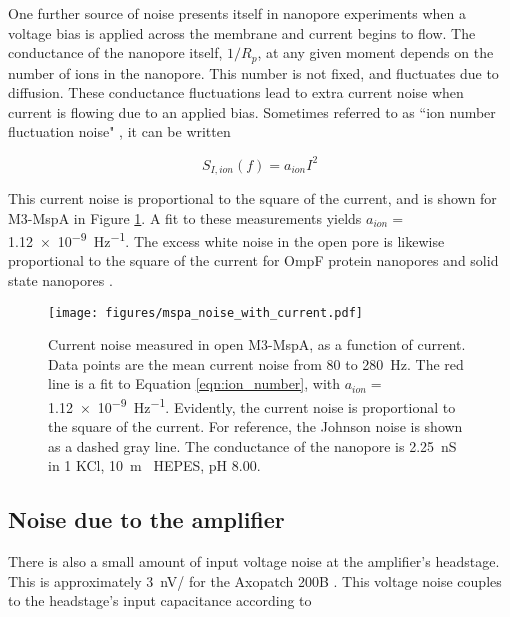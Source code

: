 One further source of noise presents itself in nanopore experiments when a voltage bias is applied across the membrane and current begins to flow.  The conductance of the nanopore itself, $1/R_p$, at any given moment depends on the number of ions in the nanopore.  This number is not fixed, and fluctuates due to diffusion.  These conductance fluctuations lead to extra current noise when current is flowing due to an applied bias.  Sometimes referred to as ``ion number fluctuation noise" \citep{Hoogerheide2010}, it can be written

\begin{equation}
S_{I,ion}(f) = a_{ion} I^2
\label{eqn:ion_number}
\end{equation}

This current noise is proportional to the square of the current, and is shown for M3-MspA in Figure \ref{fig:mspa_noise}.  A fit to these measurements yields $a_{ion} =$ \SI{1.12e-9}{\Hz^{-1}}.  The excess white noise in the open pore is likewise proportional to the square of the current for OmpF protein nanopores \citep{Queralt-Martin2015} and solid state nanopores \citep{Hoogerheide2009}.

\begin{figure}[h]
\begin{centering}
\texttt{[image: figures/mspa\_noise\_with\_current.pdf]}
\caption[Current noise in MspA depends on current]{Current noise measured in open M3-MspA, as a function of current.  Data points are the mean current noise from \num{80} to \SI{280}{\Hz}.  The red line is a fit to Equation \ref{eqn:ion_number}, with $a_{ion} = $ \SI{1.12e-9}{\Hz^{-1}}.  Evidently, the current noise is proportional to the square of the current.  For reference, the Johnson noise is shown as a dashed gray line.  The conductance of the nanopore is \SI{2.25}{\nano\siemens} in \SI{1}{\Molar} KCl, \SI{10}{\m\Molar} HEPES, pH \num{8.00}.}
\label{fig:mspa_noise}
\end{centering}
\end{figure}

\subsection{Noise due to the amplifier}

There is also a small amount of input voltage noise at the amplifier's headstage.  This is approximately \SI{3}{\nV/\sqrt{\Hz}} for the Axopatch 200B \citep{Sakmann1995}.  This voltage noise couples to the headstage's input capacitance according to

